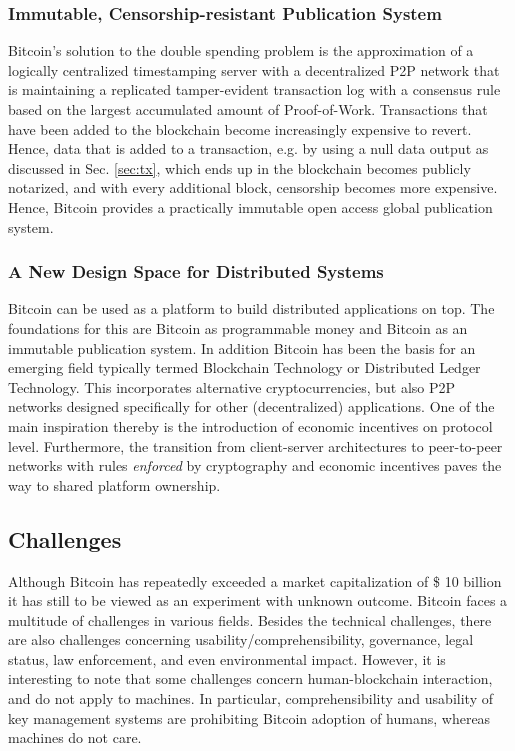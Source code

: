 \subsubsection{Immutable, Censorship-resistant Publication System}

Bitcoin's solution to the double spending problem is the approximation of a logically centralized timestamping server with a decentralized P2P network that is maintaining a replicated tamper-evident transaction log with a consensus rule based on the largest accumulated amount of Proof-of-Work. Transactions that have been added to the blockchain become increasingly expensive to revert. Hence, data that is added to a transaction, e.g. by using a null data output as discussed in Sec. \ref{sec:tx}, which ends up in the blockchain becomes publicly notarized, and with every additional block, censorship becomes more expensive. Hence, Bitcoin provides a practically immutable open access global publication system.

\subsubsection{A New Design Space for Distributed Systems}

Bitcoin can be used as a platform to build distributed applications on top. The foundations for this are Bitcoin as programmable money and Bitcoin as an immutable publication system. In addition Bitcoin has been the basis for an emerging field typically termed Blockchain Technology or Distributed Ledger Technology. This incorporates alternative cryptocurrencies, but also P2P networks designed specifically for other (decentralized) applications. One of the main inspiration thereby is the introduction of economic incentives on protocol level. Furthermore, the transition from client-server architectures to peer-to-peer networks with rules \emph{enforced} by cryptography and economic incentives paves the way to shared platform ownership.


\subsection{Challenges}
\label{sec:btc_challenges}

Although Bitcoin has repeatedly exceeded a market capitalization of \$ 10 billion it has still to be viewed as an experiment with unknown outcome. Bitcoin faces a multitude of challenges in various fields. Besides the technical challenges, there are also challenges concerning usability/comprehensibility, governance, legal status, law enforcement, and even environmental impact. However, it is interesting to note that some challenges concern human-blockchain interaction, and do not apply to machines. In particular, comprehensibility and usability of key management systems are prohibiting Bitcoin adoption of humans, whereas machines do not care.

